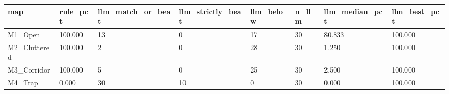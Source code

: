 \begin{tabular}{llllllll}
\hline
map & rule\_pct & llm\_match\_or\_beat & llm\_strictly\_beat & llm\_below & n\_llm & llm\_median\_pct & llm\_best\_pct \\
\hline
M1\_Open & 100.000 & 13 & 0 & 17 & 30 & 80.833 & 100.000 \\
M2\_Cluttered & 100.000 & 2 & 0 & 28 & 30 & 1.250 & 100.000 \\
M3\_Corridor & 100.000 & 5 & 0 & 25 & 30 & 2.500 & 100.000 \\
M4\_Trap & 0.000 & 30 & 10 & 0 & 30 & 0.000 & 100.000 \\
\hline
\end{tabular}
